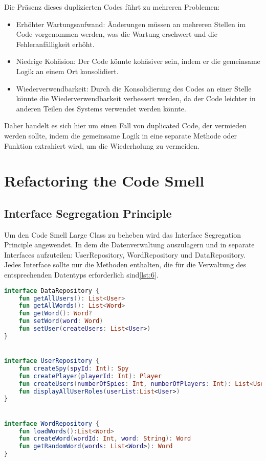 Die Präsenz dieses duplizierten Codes führt zu mehreren Problemen:

\begin{itemize}
  \item Erhöhter Wartungsaufwand: Änderungen müssen an mehreren Stellen im Code vorgenommen werden, was die Wartung erschwert und die Fehleranfälligkeit erhöht.
  \item Niedrige Kohäsion: Der Code könnte kohäsiver sein, indem er die gemeinsame Logik an einem Ort konsolidiert.
  \item Wiederverwendbarkeit: Durch die Konsolidierung des Codes an einer Stelle könnte die Wiederverwendbarkeit verbessert werden, da der Code leichter in anderen Teilen des Systems verwendet werden könnte.
\end{itemize}

Daher handelt es sich hier um einen Fall von duplicated Code, der vermieden werden sollte, indem die gemeinsame Logik in eine separate Methode oder Funktion extrahiert wird, um die Wiederholung zu vermeiden.

\section{Refactoring the Code Smell}

\subsection*{Interface Segregation Principle}
\label{ISP}
Um den Code Smell Large Class zu beheben wird das Interface Segregation Principle angewendet. In dem die Datenverwaltung auszulagern und in separate Interfaces aufzuteilen: UserRepository, WordRepository und DataRepository. Jedes Interface sollte nur die Methoden enthalten, die für die Verwaltung des entsprechenden Datentyps erforderlich sind\ref{lst:6}.\\
\begin{lstlisting}[language=Kotlin, caption={Interface Segragation Principle}, label={lst:6}]
interface DataRepository {
    fun getAllUsers(): List<User>
    fun getAllWords(): List<Word>
    fun getWord(): Word?
    fun setWord(word: Word)
    fun setUser(createUsers: List<User>)
}


interface UserRepository {
    fun createSpy(spyId: Int): Spy
    fun createPlayer(playerId: Int): Player
    fun createUsers(numberOfSpies: Int, numberOfPlayers: Int): List<User>
    fun displayAllUserRoles(userList:List<User>)
}


interface WordRepository {
    fun loadWords():List<Word>
    fun createWord(wordId: Int, word: String): Word
    fun getRandomWord(words: List<Word>): Word
}
\end{lstlisting}

